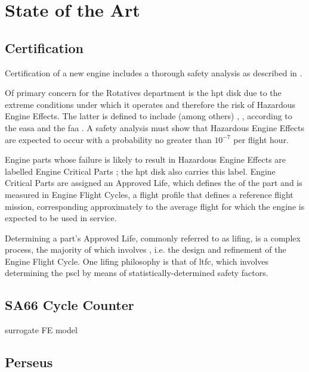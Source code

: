\section{State of the Art}

\subsection{Certification}
\label{certif}
Certification of a new engine includes a thorough safety analysis as described in \cite{easa_certification_2015}.

Of primary concern for the Rotatives department is the \ac{hpt} disk due to the extreme conditions under which it operates and therefore the risk of Hazardous Engine Effects. The latter is defined to include (among others) , ,  according to the \ac{easa} and the \ac{faa} \cite{easa_certification_2015, faa_guidance_2007}. A safety analysis must show that Hazardous Engine Effects are expected to occur with a probability no greater than \(10^{-7}\) per flight hour.

Engine parts whose failure is likely to result in Hazardous Engine Effects are labelled Engine Critical Parts \cite{easa_certification_2015}; the \ac{hpt} disk also carries this label. Engine Critical Parts are assigned an Approved Life, which defines the  \cite{easa_certification_2015} of the part and is measured in Engine Flight Cycles, a flight profile that defines a reference flight mission, corresponding approximately to the average flight for which the engine is expected to be used in service. 

Determining a part's Approved Life, commonly referred to as lifing, is a complex process, the majority of which involves  \cite{corran_lifing_2007}, i.e. the design and refinement of the Engine Flight Cycle. One lifing philosophy is that of \ac{ltfc}, which involves determining the \ac{pscl} by means of statistically-determined safety factors. 

\subsection{SA66 Cycle Counter}
\label{sa66}
surrogate FE model

\subsection{Perseus}
\label{pers}

